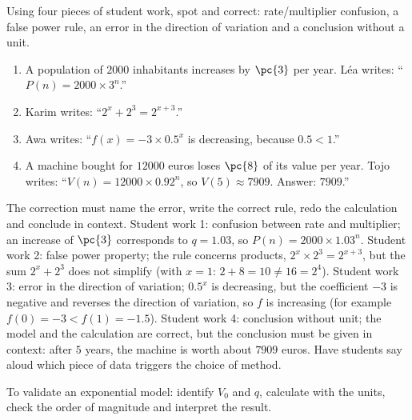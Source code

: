 \begin{activity}
Using four pieces of student work, spot and correct: rate/multiplier confusion, a false power rule, an error in the direction of variation and a conclusion without a unit.
\begin{enumerate}[label=\textbf{Production \arabic*.},leftmargin=*]
\item A population of $\num{2000}$ inhabitants increases by $\pc{3}$ per year. Léa writes: ``$P(n)=\num{2000}\times3^n$.''
\item Karim writes: ``$2^x+2^3=2^{x+3}$.''
\item Awa writes: ``$f(x)=-3\times\num{0,5}^x$ is decreasing, because $\num{0,5}<1$.''
\item A machine bought for $\num{12000}$ euros loses $\pc{8}$ of its value per year. Tojo writes: ``$V(n)=\num{12000}\times\num{0,92}^n$, so $V(5)\approx\num{7909}$. Answer: $\num{7909}$.''
\end{enumerate}

\end{activity}
\begin{solution}The correction must name the error, write the correct rule, redo the calculation and conclude in context. Student work 1: confusion between rate and multiplier; an increase of $\pc{3}$ corresponds to $q=\num{1,03}$, so $P(n)=\num{2000}\times\num{1,03}^n$. Student work 2: false power property; the rule concerns products, $2^x\times2^3=2^{x+3}$, but the sum $2^x+2^3$ does not simplify (with $x=1$: $2+8=10\neq16=2^4$). Student work 3: error in the direction of variation; $\num{0,5}^x$ is decreasing, but the coefficient $-3$ is negative and reverses the direction of variation, so $f$ is increasing (for example $f(0)=-3<f(1)=-\num{1,5}$). Student work 4: conclusion without unit; the model and the calculation are correct, but the conclusion must be given in context: after $5$ years, the machine is worth about $\num{7909}$ euros. Have students say aloud which piece of data triggers the choice of method.\end{solution}

\begin{summary}To validate an exponential model: identify $V_0$ and $q$, calculate with the units, check the order of magnitude and interpret the result.\end{summary}

